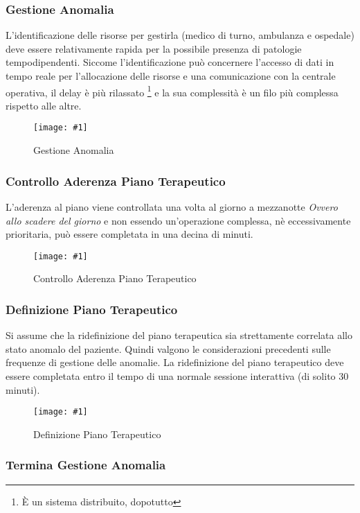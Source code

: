 \documentclass[a4paper,11pt,oneside, table]{article}
\newcommand{\putimage}[4] {
	\begin{figure}[H]
	    \centering
	    \texttt{[image: \#1]}
	    \caption{#2}\label{#3}
	\end{figure}
}
\begin{document}
\subsubsection{Gestione Anomalia}

L'identificazione delle risorse per gestirla (medico di turno, ambulanza e ospedale) deve essere relativamente rapida per la possibile presenza di patologie tempodipendenti.
Siccome l'identificazione pu\`o concernere l'accesso di dati in tempo reale per l'allocazione delle risorse e una comunicazione con la centrale operativa, il delay \`e pi\`u rilassato \footnote{\`E un sistema distribuito, dopotutto} e la sua complessit\`a \`e un filo pi\`u complessa rispetto alle altre.

\putimage{images/Diagramma delle Attivita'/Gestione Anomalia.png}{Gestione Anomalia}{png:act:gestione-anomalia}{1}

\subsubsection{Controllo Aderenza Piano Terapeutico}

L'aderenza al piano viene controllata una volta al giorno a mezzanotte \textit{Ovvero allo scadere del giorno} e non essendo un'operazione complessa, n\`e eccessivamente prioritaria, pu\`o essere completata in una decina di minuti.

\putimage{images/Diagramma delle Attivita'/Controllo Aderenza Piano Terapeutico.png}{Controllo Aderenza Piano Terapeutico}{png:act:controllo-aderenza-piano-terapeutico}{1}

\subsubsection{Definizione Piano Terapeutico}

Si assume che la ridefinizione del piano terapeutica sia strettamente correlata allo stato anomalo del paziente. Quindi valgono le considerazioni precedenti sulle frequenze di gestione delle anomalie.
La ridefinizione del piano terapeutico deve essere completata entro il tempo di una normale sessione interattiva (di solito 30 minuti).

\putimage{images/Diagramma delle Attivita'/Definizione Piano Terapeutico.png}{Definizione Piano Terapeutico}{png:act:definizione-piano-terapeutico}{1}

\subsubsection{Termina Gestione Anomalia}
\end{document}

